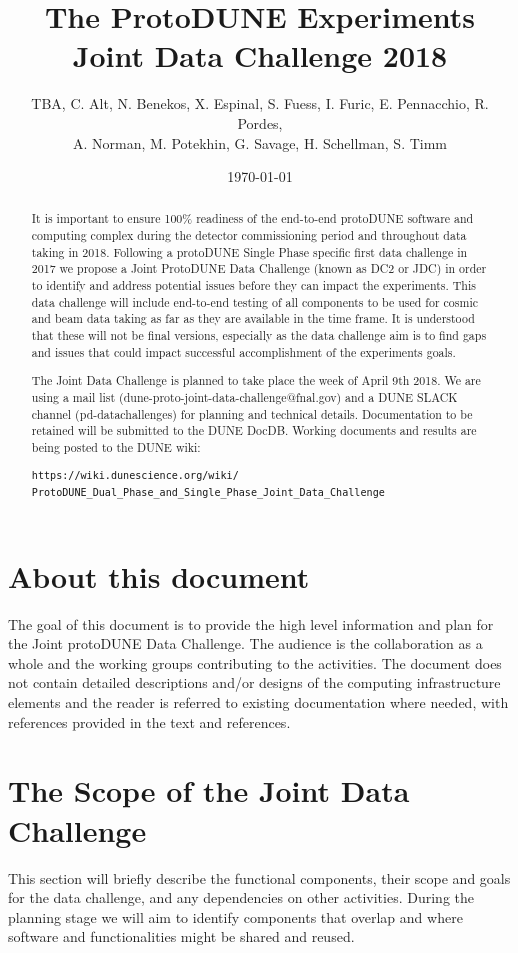 \documentclass[pdftex,12pt,letter]{article}
\title{The ProtoDUNE Experiments \\
Joint Data Challenge 2018}
\date{\today}
\author{TBA, C. Alt, N. Benekos, X. Espinal, S. Fuess, I. Furic, E. Pennacchio, R. Pordes,   \\
A. Norman, M. Potekhin, G. Savage, H. Schellman, S. Timm}
\newcommand{\pd}{protoDUNE\xspace}
\newcommand{\singp}{Single Phase\xspace}
\begin{document}
\maketitle

\begin{abstract}

\noindent It is important to ensure 100\% readiness of the
end-to-end \pd software and computing complex during the detector commissioning period and
throughout data taking in 2018.  Following a \pd \singp  specific first data challenge in 2017 we propose a Joint ProtoDUNE  Data Challenge (known as DC2 or JDC) in order to identify
and address potential issues before they can impact the experiments.
This data challenge will include end-to-end testing of all components to be used for cosmic and beam data taking as far as they are available in the time frame. It is understood that these will not be final versions, especially as the data challenge aim is to find gaps and issues that could impact successful accomplishment of the experiments goals. 

The Joint Data Challenge is planned to take place the week of April 9th 2018.  We are using a mail list (dune-proto-joint-data-challenge@fnal.gov) and a DUNE SLACK channel (pd-datachallenges) for planning and technical details.  Documentation to be retained will be submitted to the DUNE DocDB. 
Working documents and results are being posted to the DUNE wiki:
\begin{verbatim}
https://wiki.dunescience.org/wiki/
ProtoDUNE_Dual_Phase_and_Single_Phase_Joint_Data_Challenge
\end{verbatim}
\end{abstract}

\tableofcontents

\pagebreak

\section{About this document}

The goal of this document is to provide the high level information and plan for  the Joint  \pd Data Challenge. The audience is the collaboration as a whole and  the  working groups contributing to the activities.
The document does not contain detailed descriptions
and/or designs of the computing
infrastructure elements and the reader is referred to existing documentation where
needed, with references provided in the text and references. 

\section{The Scope of the Joint Data Challenge}
This section will briefly describe the functional components, their scope and goals for the data challenge,  and any dependencies on other activities. During the planning stage we will aim to identify components that overlap and where software and functionalities might be shared and reused. 
\end{document}
